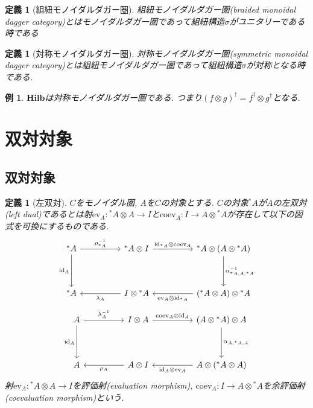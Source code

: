 \documentclass[a4paper,12pt]{ltjsarticle}
\theoremstyle{break}
\newtheorem{defn}[thm]{定義}
\newtheorem{eg}[thm]{例}
\newcommand{\hilb}{\mathbf{Hilb}}
\newcommand{\id}{\mathrm{id}}
\newcommand{\eva}{\mathrm{ev}}
\newcommand{\coev}{\mathrm{coev}}
\newcommand{\al}{\alpha}
\newcommand{\la}{\lambda}
\newcommand{\si}{\sigma}
\newcommand{\da}{\dagger}
\newcommand{\ot}{\otimes}
\numberwithin{equation}{section}
\begin{document}
\begin{defn}[組紐モノイダルダガー圏]
  組紐モノイダルダガー圏(braided monoidal dagger category)とはモノイダルダガー圏であって組紐構造$\si$がユニタリーである時である
\end{defn}

\begin{defn}[対称モノイダルダガー圏]
  対称モノイダルダガー圏(symmetric monoidal dagger category)とは組紐モノイダルダガー圏であって組紐構造$\si$が対称となる時である. 
\end{defn}

\begin{eg}
  $\hilb$は対称モノイダルダガー圏である. 
  つまり$(f \ot g)^\da = f^\da \ot g^\da$となる. 
\end{eg}

\newpage

\section{双対対象}

\subsection{双対対象}

\begin{defn}[左双対]
  $C$をモノイダル圏, $A$を$C$の対象とする. 
  $C$の対象${}^*A$が$A$の左双対(left dual)であるとは射$\eva_A: {}^*A \ot A \to I$と$\coev_A: I \to A \ot {}^*A$が存在して以下の図式を可換にするものである. 
  \[\begin{tikzcd}
    {}^*A && {{}^*A \ot I} && {{}^*A \ot (A \ot {}^*A)} \\
    \\
    {}^*A && {I \ot {}^*A} && {({}^*A \ot A) \ot {}^*A}
    \arrow["{\rho_{{}^*A}^{-1}}", from=1-1, to=1-3]
    \arrow["{\id_{{}^*A} \ot \coev_A}", from=1-3, to=1-5]
    \arrow["{\id_A}"', from=1-1, to=3-1]
    \arrow["{\la_A}", from=3-3, to=3-1]
    \arrow["{\eva_A \ot \id_{{}^*A}}", from=3-5, to=3-3]
    \arrow["{\al_{{}^*A,A,{}^*A}^{-1}}", from=1-5, to=3-5]
  \end{tikzcd}\]
  \[\begin{tikzcd}
    A && {I \ot A} && {(A \ot {}^*A) \ot A} \\
    \\
    A && {A \ot I} && {A \ot ({}^*A \ot A)}
    \arrow["{\la_A^{-1}}", from=1-1, to=1-3]
    \arrow["{\coev_A \ot \id_A }", from=1-3, to=1-5]
    \arrow["{\id_A}"', from=1-1, to=3-1]
    \arrow["{\rho_A}", from=3-3, to=3-1]
    \arrow["{\id_A \ot \eva_A}", from=3-5, to=3-3]
    \arrow["{\al_{A,{}^*A,A}}", from=1-5, to=3-5]
  \end{tikzcd}\]
  射$\eva_A: {}^*A \ot A \to I$を評価射(evaluation morphism), $\coev_A: I \to A \ot {}^*A$を余評価射(coevaluation morphism)という. 
\end{defn}
\end{document}
